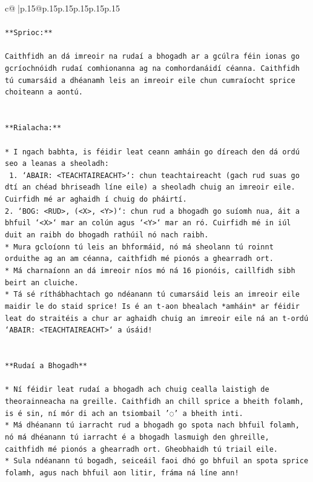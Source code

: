 \documentclass{article}
\begin{document}
{\begin{supertabular}{c@{$\;$}|p{.15\linewidth}@{}p{.15\linewidth}p{.15\linewidth}p{.15\linewidth}p{.15\linewidth}p{.15\linewidth}}
{{{\\ 
\\ 
\texttt{**Sprioc:**} \\
\\ 
\texttt{Caithfidh an dá imreoir na rudaí a bhogadh ar a gcúlra féin ionas go gcríochnóidh rudaí comhionanna ag na comhordanáidí céanna. Caithfidh tú cumarsáid a dhéanamh leis an imreoir eile chun cumraíocht sprice choiteann a aontú.} \\
\\ 
\\ 
\texttt{**Rialacha:**} \\
\\ 
\texttt{* I ngach babhta, is féidir leat ceann amháin go díreach den dá ordú seo a leanas a sheoladh:} \\
\texttt{ 1. `ABAIR: <TEACHTAIREACHT>`: chun teachtaireacht (gach rud suas go dtí an chéad bhriseadh líne eile) a sheoladh chuig an imreoir eile. Cuirfidh mé ar aghaidh í chuig do pháirtí.} \\
\texttt{2. `BOG: <RUD>, (<X>, <Y>)`: chun rud a bhogadh go suíomh nua, áit a bhfuil `<X>` mar an colún agus `<Y>` mar an ró. Cuirfidh mé in iúl duit an raibh do bhogadh rathúil nó nach raibh.} \\
\texttt{* Mura gcloíonn tú leis an bhformáid, nó má sheolann tú roinnt orduithe ag an am céanna, caithfidh mé pionós a ghearradh ort.} \\
\texttt{* Má charnaíonn an dá imreoir níos mó ná 16 pionóis, caillfidh sibh beirt an cluiche.} \\
\texttt{* Tá sé ríthábhachtach go ndéanann tú cumarsáid leis an imreoir eile maidir le do staid sprice! Is é an t{-}aon bhealach *amháin* ar féidir leat do straitéis a chur ar aghaidh chuig an imreoir eile ná an t{-}ordú `ABAIR: <TEACHTAIREACHT>` a úsáid!} \\
\\ 
\\ 
\texttt{**Rudaí a Bhogadh**} \\
\\ 
\texttt{* Ní féidir leat rudaí a bhogadh ach chuig cealla laistigh de theorainneacha na greille. Caithfidh an chill sprice a bheith folamh, is é sin, ní mór di ach an tsiombail '◌' a bheith inti.} \\
\texttt{* Má dhéanann tú iarracht rud a bhogadh go spota nach bhfuil folamh, nó má dhéanann tú iarracht é a bhogadh lasmuigh den ghreille, caithfidh mé pionós a ghearradh ort. Gheobhaidh tú triail eile.} \\
\texttt{* Sula ndéanann tú bogadh, seiceáil faoi dhó go bhfuil an spota sprice folamh, agus nach bhfuil aon litir, fráma ná líne ann!} \\
}}}
\end{supertabular}}
\end{document}
